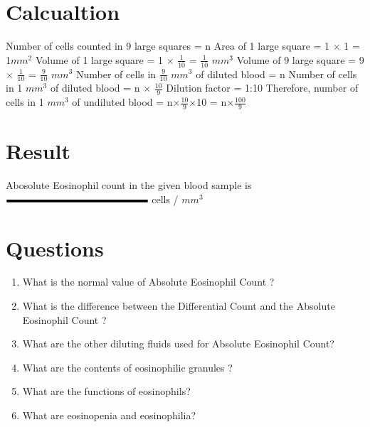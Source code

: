 \documentclass[a4paper,12pt]{book}
\begin{document}
					\section*{Calcualtion}
					Number of cells counted in 9 large squares				=	n\newline\vspace{.2cm}
					Area of 1 large square				=	1 $\times$ 1		=	1$mm^2$	\newline\vspace{.2cm}
					Volume of 1 large square				=	1 $\times$ $\frac{1}{10}$	=	$\frac{1}{10}$ $mm^3$\newline\vspace{.2cm}
					Volume of 9 large square				=	9 $\times$ $\frac{1}{10}$	=	$\frac{9}{10}$ $mm^3$\newline\vspace{.2cm}
					Number of cells in $\frac{9}{10}$ $mm^3$ of diluted blood				=	n\newline\vspace{.2cm}
					Number of cells in 1 $mm^3$ of diluted blood				=	n $\times$ $\frac{10}{9}$\newline\vspace{.2cm}
					Dilution factor								=	1:10\newline\vspace{.2cm}
					Therefore, number of cells in 1 $mm^3$ of undiluted blood		=	n$\times$$\frac{10}{9}$$\times$10
					=	n$\times$$\frac{100}{9}$
					\section*{Result}

					Abosolute Eosinophil count in the given  blood sample is $\rule{5cm}{0.1cm}$ cells / $mm^3$

					\section*{Questions}
					\begin{enumerate}

						\item{What is the normal value of Absolute Eosinophil Count ?}
						\item{What is the difference between the Differential Count and the Absolute Eosinophil Count ?}
						\item{What are the other diluting fluids used for Absolute Eosinophil Count?}
						\item{What are the contents of eosinophilic granules ?}
						\item{What are the functions of eosinophils?}
						\item{What are eosinopenia and eosinophilia?}
					\end{enumerate}
\end{document}
